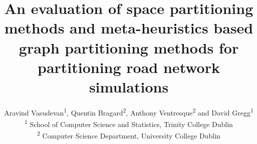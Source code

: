 \documentclass{wscpaperproc}
\theoremstyle{wsc}
\begin{document}
%
%

\title{An evaluation of space partitioning methods and meta-heuristics based graph partitioning methods for partitioning road network simulations}

\author{Aravind Vasudevan\textsuperscript{1}, Quentin Bragard\textsuperscript{2}, Anthony Ventresque\textsuperscript{2} and David Gregg\textsuperscript{1}\\ [12pt]
\textsuperscript{1} School of Computer Science and Statistics, Trinity College Dublin\\
\textsuperscript{2} Computer Science Department, University College Dublin\\
}
\end{document}
